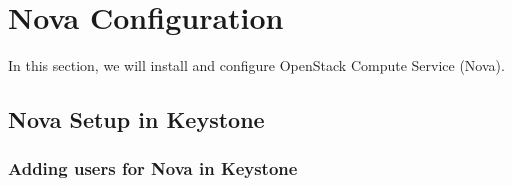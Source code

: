 \chapter{Nova Configuration}
\par In this section, we will install and configure OpenStack Compute Service (Nova).
\begin{spacing}{1.2}
\section{Nova Setup in Keystone}
\subsection{Adding users for Nova in Keystone}


\end{spacing}
